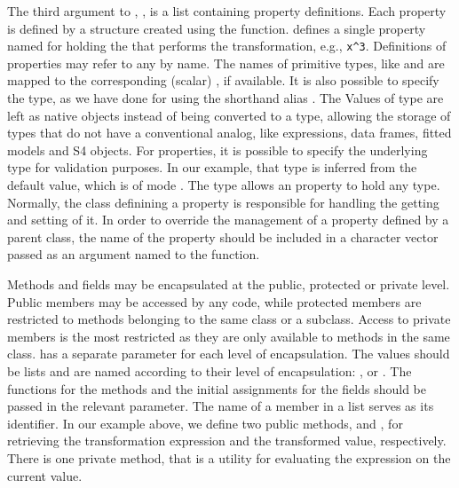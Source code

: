 \documentclass[article,shortnames]{jss}
\begin{document}
The third argument to , , is a list
containing property definitions.
Each property is defined by a  structure created
using the  function. 
defines a single property named  for holding the
  that performs the transformation, e.g.,
\verb+x^3+. Definitions of properties may refer to any  by
name. The names of primitive  types, like 
and  are mapped to the corresponding (scalar)
, if available. 
It is also possible to specify the 
 type, as we have done for
 using the shorthand alias .  The
Values of type  are left
as native  objects instead of being converted to a
 type, allowing the storage of  types that do
not have a conventional  analog, like expressions, data
frames, fitted models and S4 objects. For  properties,
it is possible to specify the underlying  type for
validation purposes. In our example, that type is inferred from the
default value, which is of mode 
.  The  type
allows an  property to hold any  type.
Normally, the class definining a property is responsible for handling
the getting and setting of it. In order to override the management of
a property defined by a parent class, the name of the property should
be included in a character vector passed as an argument named
 to the  function.

Methods and fields may be encapsulated at the public, protected or
private level.  Public members may be accessed by any code, while
protected members are restricted to methods belonging to the same
class or a subclass. Access to private members is the most restricted
as they are only available to methods in the same class. 
has a separate parameter for each level of encapsulation. The
values should be lists and are named according to their level of
encapsulation:
,  or .  The functions
for the methods and the initial assignments for the fields should be
passed in the relevant parameter. The name of a member in a list
serves as its identifier. In our example above, we define two public
methods,  and , for retrieving
the transformation expression and the transformed value,
respectively. There is one private method,  that
is a utility for evaluating the expression on the current value.
\end{document}
